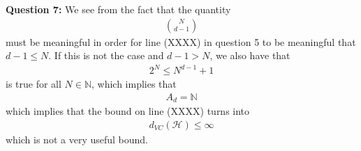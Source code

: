 \textbf{Question 7:} We see from the fact that the quantity
\begin{align}
\binom{N}{d-1}
\end{align}
must be meaningful in order for line (XXXX) in question 5 to be meaningful that $d-1\leq N$. If this is not the case and $d-1>N$, we also have that
\begin{align}
2^N \leq N^{d-1} + 1
\end{align}
is true for all $N \in \mathbb{N}$, which implies that
\begin{align}
A_d = \mathbb{N}
\end{align}
which implies that the bound on line (XXXX) turns into
\begin{align}
d_{VC}(\mathcal{H}) \leq \infty
\end{align}
which is not a very useful bound.